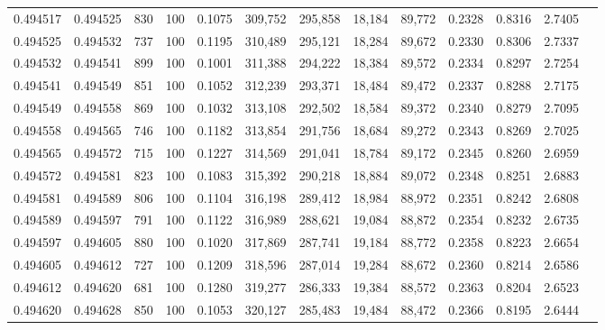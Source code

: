 \begin{tabular}{rrrrrrrrrrrrr}
0.494517 & 0.494525 &   830 & 100 &                                     0.1075 & 309,752 & 295,858 &  18,184 &  89,772 & 0.2328 & 0.8316 & 2.7405 \\
0.494525 & 0.494532 &   737 & 100 &                                     0.1195 & 310,489 & 295,121 &  18,284 &  89,672 & 0.2330 & 0.8306 & 2.7337 \\
0.494532 & 0.494541 &   899 & 100 &                                     0.1001 & 311,388 & 294,222 &  18,384 &  89,572 & 0.2334 & 0.8297 & 2.7254 \\
0.494541 & 0.494549 &   851 & 100 &                                     0.1052 & 312,239 & 293,371 &  18,484 &  89,472 & 0.2337 & 0.8288 & 2.7175 \\
0.494549 & 0.494558 &   869 & 100 &                                     0.1032 & 313,108 & 292,502 &  18,584 &  89,372 & 0.2340 & 0.8279 & 2.7095 \\
0.494558 & 0.494565 &   746 & 100 &                                     0.1182 & 313,854 & 291,756 &  18,684 &  89,272 & 0.2343 & 0.8269 & 2.7025 \\
0.494565 & 0.494572 &   715 & 100 &                                     0.1227 & 314,569 & 291,041 &  18,784 &  89,172 & 0.2345 & 0.8260 & 2.6959 \\
0.494572 & 0.494581 &   823 & 100 &                                     0.1083 & 315,392 & 290,218 &  18,884 &  89,072 & 0.2348 & 0.8251 & 2.6883 \\
0.494581 & 0.494589 &   806 & 100 &                                     0.1104 & 316,198 & 289,412 &  18,984 &  88,972 & 0.2351 & 0.8242 & 2.6808 \\
0.494589 & 0.494597 &   791 & 100 &                                     0.1122 & 316,989 & 288,621 &  19,084 &  88,872 & 0.2354 & 0.8232 & 2.6735 \\
0.494597 & 0.494605 &   880 & 100 &                                     0.1020 & 317,869 & 287,741 &  19,184 &  88,772 & 0.2358 & 0.8223 & 2.6654 \\
0.494605 & 0.494612 &   727 & 100 &                                     0.1209 & 318,596 & 287,014 &  19,284 &  88,672 & 0.2360 & 0.8214 & 2.6586 \\
0.494612 & 0.494620 &   681 & 100 &                                     0.1280 & 319,277 & 286,333 &  19,384 &  88,572 & 0.2363 & 0.8204 & 2.6523 \\
0.494620 & 0.494628 &   850 & 100 &                                     0.1053 & 320,127 & 285,483 &  19,484 &  88,472 & 0.2366 & 0.8195 & 2.6444 \\

\end{tabular}
